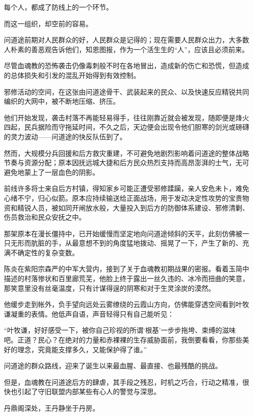 每个人，都成了防线上的一个环节。

而这一组织，却空前的容易。

问道途前期对人民群众的好，人民群众是记得的；现在需要人民群众出力，大多数人朴素的善恶观告诉他们，知恩图报，作为一个活生生的“人”，应该且必须前来。

尽管血魂教的恐怖袭击仍像毒刺般不时在各地冒出，造成新的伤亡和恐慌，但造成的总体损失和引发的混乱开始得到有效控制。

邪修活动的空间，在这张由问道途骨干、武装起来的民众、以及快速反应精锐共同编织的大网中，被不断地压缩、挤压。

他们开始发现，袭击村落不再能轻易得手，往往刚靠近就会被发现，随即便是烽火四起，民兵据险而守拖延时间，不久之后，天边便会出现令他们胆寒的剑光或磅礴的灵力波动——问道途的快反队伍到了。

然而，大规模分兵回援和后方救灾重建，不可避免地剧烈影响着问道途的整体战略节奏与资源分配；原本因抚远城大捷和后方民众热烈支持而高昂澎湃的士气，无可避免地蒙上了一层血色的阴影。

前线许多将士来自后方村镇，得知家乡可能正遭受邪修蹂躏，亲人安危未卜，难免心绪不宁，归心似箭。原本应持续输送给正面战场，用于发动决定性攻势的宝贵物资和精锐人员，被如同开闸放水般，大量投入到后方的防御体系建设、邪修清剿、伤员救治和民众安抚之中。

那架原本在漫长僵持中，已开始缓慢而坚定地向问道途倾斜的天平，此刻仿佛被一只无形而肮脏的手，从最意想不到的角度猛地拨动、摇晃了一下，产生了新的、充满不确定性的复杂变数。

陈炎在紫阳宗森严的中军大营内，接到了关于血魂教初期战果的密报。看着玉简中描述的村落惨状和百里廊荒芜，他脸上终于露出一丝久违的、冰冷而扭曲的笑意，那笑意里没有丝毫温度，只有计谋得逞的阴寒和对于生灵涂炭的漠然。

他缓步走到帐外，负手望向远处云雾缭绕的云霞山方向，仿佛能穿透空间看到叶牧谦凝重的表情。他低声自语，声音轻得只有自己能听见：

“叶牧谦，好好感受一下，被你自己珍视的所谓‘根基’一步步拖垮、束缚的滋味吧。正道？民心？在绝对的力量和赤裸裸的生存威胁面前，我倒要看看，你那些美好的理念，究竟能支撑多久，又能保护得了谁。”

问道途的群众路线，迎来了诞生以来最血腥、最直接、也最残酷的挑战。

\vspace{2em}

但是，血魂教在问道途后方的肆虐，其手段之残忍，时机之巧合，行动之精准，很快也引起了守旧联盟内部某些有心人的警觉与深思。

丹鼎阁深处，王丹静坐于丹房。

